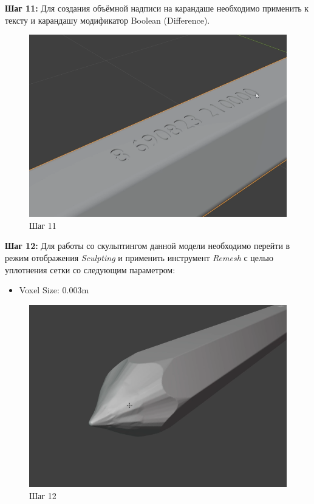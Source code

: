 \documentclass[areasetadvanced]{scrartcl}
\begin{document}
\par \textbf{Шаг 11:} Для создания объёмной надписи на карандаше необходимо применить к тексту и карандашу модификатор Boolean (Difference).
\begin{figure}[H]
    \label{4} 
    \centering
    \includegraphics[width=0.6\linewidth]{pen/11.png}
    \caption{Шаг 11}
\end{figure}


\par \textbf{Шаг 12:} Для работы со скульптингом данной модели необходимо перейти в режим отображения \textit{Sculpting} и применить инструмент \textit{Remesh} с целью уплотнения сетки со следующим параметром:
\begin{itemize}
    \item Voxel Size: 0.003m
\end{itemize}
\begin{figure}[H]
    \label{4}  
    \centering
    \includegraphics[width=0.6\linewidth]{pen/12.png}
    \caption{Шаг 12}
\end{figure}
\end{document}
